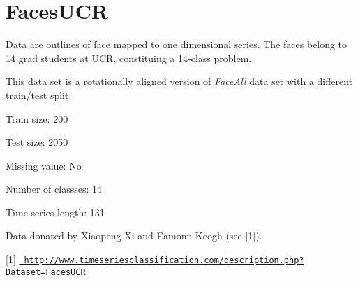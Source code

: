 \chapter{Faces\+UCR}
\hypertarget{md_external_2data_2UCRArchive__2018_2FacesUCR_2README}{}\label{md_external_2data_2UCRArchive__2018_2FacesUCR_2README}
\label{md_external_2data_2UCRArchive__2018_2FacesUCR_2README_autotoc_md71}%
%
 Data are outlines of face mapped to one dimensional series. The faces belong to 14 grad students at UCR, constituing a 14-\/class problem.

This data set is a rotationally aligned version of {\itshape Face\+All} data set with a different train/test split.

Train size\+: 200

Test size\+: 2050

Missing value\+: No

Number of classses\+: 14

Time series length\+: 131

Data donated by Xiaopeng Xi and Eamonn Keogh (see \mbox{[}1\mbox{]}).

\mbox{[}1\mbox{]} \href{http://www.timeseriesclassification.com/description.php?Dataset=FacesUCR}{\texttt{ http\+://www.\+timeseriesclassification.\+com/description.\+php?\+Dataset=\+Faces\+UCR}} 
